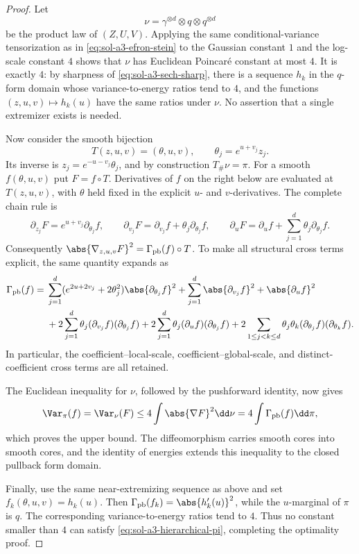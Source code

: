 \documentclass[../main.tex]{subfiles}
\begin{document}
\begin{proof}
Let
\[
 \nu=\gamma^{\otimes d}\otimes q\otimes q^{\otimes d}
\]
be the product law of $(Z,U,V)$.  Applying the same conditional-variance tensorization as in
\eqref{eq:sol-a3-efron-stein} to the Gaussian constant $1$ and the log-scale constant $4$
shows that $\nu$ has Euclidean Poincar\'e constant at most $4$.  It is exactly $4$: by
sharpness of \eqref{eq:sol-a3-sech-sharp}, there is a sequence $h_k$ in the $q$-form domain
whose variance-to-energy ratios tend to $4$, and the functions $(z,u,v)\mapsto h_k(u)$ have the
same ratios under $\nu$.  No assertion that a single extremizer exists is needed.

Now consider the smooth bijection
\[
 T(z,u,v)=(\theta,u,v),\qquad \theta_j=e^{u+v_j}z_j.
\]
Its inverse is $z_j=e^{-u-v_j}\theta_j$, and by construction $T_\#\nu=\pi$.  For a smooth
$f(\theta,u,v)$ put $F=f\circ T$.  Derivatives of $f$ on the right below are evaluated at
$T(z,u,v)$, with $\theta$ held fixed in the explicit $u$- and $v$-derivatives.  The complete
chain rule is
\begin{equation}
\label{eq:sol-a3-chain-rule}
 \partial_{z_j}F=e^{u+v_j}\partial_{\theta_j}f,
 \qquad
 \partial_{v_j}F=\partial_{v_j}f+\theta_j\partial_{\theta_j}f,
 \qquad
 \partial_uF=\partial_uf+\sum_{j=1}^d\theta_j\partial_{\theta_j}f.
\end{equation}
Consequently $\abs{\nabla_{z,u,v}F}^2=\Gamma_{\mathrm{pb}}(f)\circ T$.  To make all structural
cross terms explicit, the same quantity expands as
\begin{align}
\label{eq:sol-a3-expanded-cross-terms}
 \Gamma_{\mathrm{pb}}(f)
 ={}&\sum_{j=1}^d(e^{2u+2v_j}+2\theta_j^2)
             \abs{\partial_{\theta_j}f}^2
     +\sum_{j=1}^d\abs{\partial_{v_j}f}^2+\abs{\partial_uf}^2 \\
 &+2\sum_{j=1}^d\theta_j(\partial_{v_j}f)(\partial_{\theta_j}f)
   +2\sum_{j=1}^d\theta_j(\partial_uf)(\partial_{\theta_j}f)
   +2\sum_{1\le j<k\le d}\theta_j\theta_k
       (\partial_{\theta_j}f)(\partial_{\theta_k}f).
\end{align}
In particular, the coefficient--local-scale, coefficient--global-scale, and distinct-coefficient
cross terms are all retained.

The Euclidean inequality for $\nu$, followed by the pushforward identity, now gives
\[
 \Var_\pi(f)=\Var_\nu(F)
 \le4\int\abs{\nabla F}^2\dd\nu
 =4\int\Gamma_{\mathrm{pb}}(f)\dd\pi,
\]
which proves the upper bound.  The diffeomorphism carries smooth cores into smooth cores, and
the identity of energies extends this inequality to the closed pullback form domain.

Finally, use the same near-extremizing sequence as above and set
$f_k(\theta,u,v)=h_k(u)$.  Then
$\Gamma_{\mathrm{pb}}(f_k)=\abs{h_k'(u)}^2$, while the $u$-marginal of $\pi$ is $q$.
The corresponding variance-to-energy ratios tend to $4$.  Thus no constant smaller than $4$
can satisfy \eqref{eq:sol-a3-hierarchical-pi}, completing the optimality proof.
\end{proof}
\end{document}
